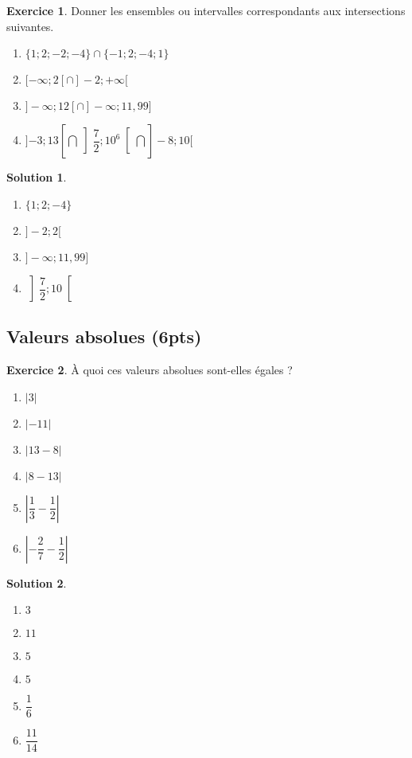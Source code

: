 \documentclass[a4paper, 14pt]{extarticle}
\theoremstyle{plain}
\newtheorem*{sol}{Solution}
\theoremstyle{definition}
\newtheorem{ex}{Exercice}
\newcommand{\vabs}[1]{
	\left| #1 \right|
}
\newcommand{\pinfty}{{+}\infty}
\newcommand{\minfty}{{-}\infty}
\newcommand{\exe}[2]{
		\begin{ex} #1  \end{ex}
		\begin{sol} #2 \end{sol}
	}
\newcommand{\exe}[2]{
		\begin{ex} #1  \end{ex}
	}
\begin{document}
\exe{
	Donner les ensembles ou intervalles correspondants aux intersections suivantes.
	\begin{multicols}{2}
	\begin{enumerate}
		\item $\{ 1 ; 2 ; -2 ; -4 \} \cap \{  -1; 2 ; -4 ; 1\}$
		\item $[\minfty ; 2[ \cap ]{-}2 ; \pinfty[$
		\item $ ]\minfty ; 12[ \cap ]\minfty ; 11{,}99]$
		\item $]{-3};13[ \bigcap \left]\dfrac72; 10^6\right[ \bigcap ]{-}8; 10[$
	\end{enumerate}
	\end{multicols}
}
{

	\begin{multicols}{2}
	\begin{enumerate}
		\item $\{ 1 ; 2 ; -4\}$
		\item $]-2; 2[$
		\item $]\minfty ; 11{,}99]$
		\item $\left]\dfrac72 ; 10\right[$
	\end{enumerate}
	\end{multicols}

}


\subsection*{Valeurs absolues (6pts)}


\exe{
	À  quoi ces valeurs absolues sont-elles égales ?
	\begin{multicols}{2}
	\begin{enumerate}
		\item $\vabs{3}$
		\item $\vabs{-11}$
		\item $\vabs{13 - 8}$
		\item $\vabs{8-13}$
		\item $\vabs{\dfrac13 - \dfrac12}$
		\item $\vabs{-\dfrac27 - \dfrac12}$
	\end{enumerate}
	\end{multicols}
}
{

	\begin{multicols}{2}
	\begin{enumerate}
		\item $3$
		\item $11$
		\item $5$
		\item $5$
		\item $\dfrac16$
		\item $\dfrac{11}{14}$
	\end{enumerate}
	\end{multicols}

}
\end{document}
